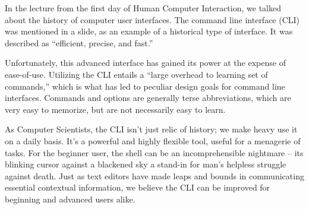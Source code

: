 In the lecture from the first day of Human Computer Interaction, we talked about
the history of computer user interfaces. The command line interface (CLI) was
mentioned in a slide, as an example of a historical type of interface. It was
described as ``efficient, precise, and fast.''

Unfortunately, this advanced interface has gained its power at the expense of
ease-of-use. Utilizing the CLI entails a “large overhead to learning set of
commands,” which is what has led to peculiar design goals for command line
interfaces. Commands and options are generally terse abbreviations, which are
very easy to memorize, but are not necessarily easy to learn.

As Computer Scientists, the CLI isn’t just relic of history; we make heavy use
it on a daily basis. It’s a powerful and highly flexible tool, useful for a
menagerie of tasks. For the beginner user, the shell can be an incomprehensible
nightmare \--- its blinking cursor against a blackened sky a stand-in for man's
helpless struggle against death. Just as text editors have made leaps and bounds
in communicating essential contextual information, we believe the CLI can be
improved for beginning and advanced users alike.

